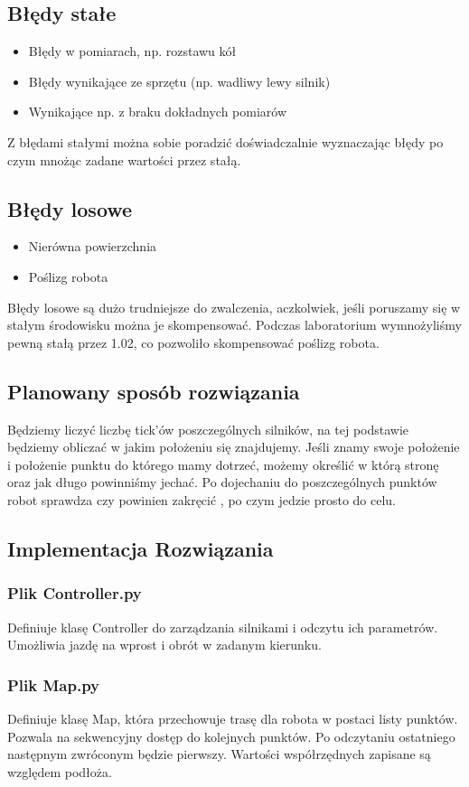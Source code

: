 \documentclass[paper=a4, fontsize=11pt]{scrartcl} %
\numberwithin{equation}{section} %
\numberwithin{figure}{section} %
\numberwithin{table}{section} %
\begin{document}
\subsection{Błędy stałe}
\begin{itemize}
\item Błędy w pomiarach, np. rozstawu kół
\item Błędy wynikające ze sprzętu (np. wadliwy lewy silnik)
\item Wynikające np. z braku dokładnych pomiarów
\end{itemize}
Z błędami stałymi można sobie poradzić doświadczalnie wyznaczając błędy po czym mnożąc zadane  wartości przez stałą. 
\subsection{Błędy losowe}
\begin{itemize}
\item Nierówna powierzchnia 
\item Poślizg robota
\end{itemize}
Błędy losowe są dużo trudniejsze do zwalczenia, aczkolwiek, jeśli poruszamy się w stałym środowisku można je skompensować. Podczas laboratorium  wymnożyliśmy pewną stałą przez 1.02, co pozwoliło skompensować poślizg robota.  
\subsection{Planowany sposób rozwiązania}
Będziemy liczyć liczbę tick'ów poszczególnych silników, na tej podstawie będziemy obliczać w jakim położeniu się znajdujemy. Jeśli znamy swoje położenie i położenie punktu do którego mamy dotrzeć, możemy określić w którą stronę oraz jak długo powinniśmy jechać.  Po dojechaniu do poszczególnych punktów robot sprawdza czy powinien zakręcić , po czym jedzie prosto  do celu.
\subsection{Implementacja Rozwiązania}
\subsubsection{Plik Controller.py}
Definiuje klasę Controller do zarządzania silnikami i odczytu ich parametrów. Umożliwia jazdę na wprost i obrót w zadanym kierunku.
\subsubsection{Plik Map.py}
Definiuje klasę Map, która przechowuje trasę dla robota w postaci listy punktów. Pozwala na sekwencyjny dostęp do kolejnych punktów. Po odczytaniu ostatniego następnym zwróconym będzie pierwszy. Wartości współrzędnych zapisane są względem podłoża.
\end{document}

